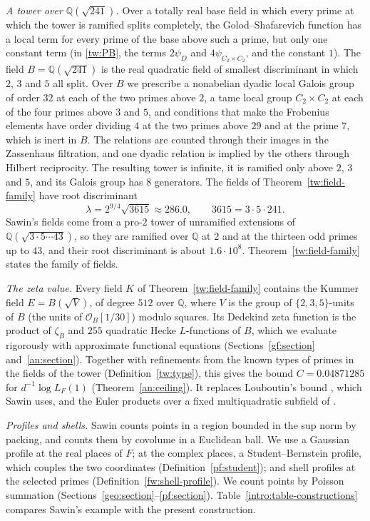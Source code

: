 \documentclass[11pt]{amsart}
\numberwithin{equation}{section}
\theoremstyle{definition}
\theoremstyle{remark}
\newcommand{\Q}{\mathbb Q}
\newcommand{\ceiling}{0.04871285}
\begin{document}
\emph{A tower over $\Q(\sqrt{241})$.} Over a totally real base field in
which every prime at which the tower is ramified splits completely, the
Golod--Shafarevich function has a local term for every prime of the
base above such a prime, but only one constant term (in
\eqref{tw:PB}, the terms $2\psi_D$ and $4\psi_{C_2\times C_2}$, and the
constant $1$). The field
$B=\Q(\sqrt{241})$ is the real quadratic field of smallest discriminant
in which $2$, $3$ and $5$ all split. Over $B$ we prescribe a nonabelian
dyadic local Galois group of order $32$ at each of the two primes above
$2$, a tame local group $C_2\times C_2$ at each of the four primes above
$3$ and $5$, and conditions that make the Frobenius elements have order
dividing $4$ at the two primes above $29$ and at the prime $7$, which is
inert in $B$. The relations are counted through their images in the
Zassenhaus filtration, and one dyadic relation is implied by the others
through Hilbert reciprocity. The resulting tower is infinite, it is
ramified only above $2$, $3$ and $5$, and its Galois group has $8$
generators. The fields of Theorem~\ref{tw:field-family} have root
discriminant
\[
 \lambda=2^{9/4}\sqrt{3615}\approx286.0,
 \qquad 3615=3\cdot5\cdot241.
\]
Sawin's fields come from a pro-$2$ tower of unramified extensions of
$\Q(\sqrt{3\cdot5\cdots43})$, so they are ramified over $\Q$ at $2$ and at
the thirteen odd primes up to $43$, and their root discriminant is about
$1.6\cdot10^8$. Theorem~\ref{tw:field-family}
states the family of fields.

\emph{The zeta value.} Every field $K$ of Theorem~\ref{tw:field-family}
contains the Kummer field $E=B(\sqrt V)$, of degree $512$ over $\Q$,
where $V$ is the group of $\{2,3,5\}$-units of $B$ (the units of
$\mathcal O_B[1/30]$) modulo squares. Its
Dedekind zeta function is the product of $\zeta_B$ and $255$ quadratic
Hecke $L$-functions of $B$, which we evaluate rigorously with approximate
functional equations (Sections~\ref{gf:section} and~\ref{an:section}).
Together with refinements from the known types of primes in the fields
of the tower (Definition~\ref{tw:type}), this gives the bound $C=\ceiling$ for $d^{-1}\log L_F(1)$
(Theorem~\ref{an:ceiling}). It replaces Louboutin's bound
\cite{Louboutin2000}, which Sawin uses, and the Euler products over a
fixed multiquadratic subfield of \cite{Naslund0358}.

\emph{Profiles and shells.} Sawin counts points in a region bounded in
the sup norm by packing, and \cite{Naslund0358} counts them by covolume
in a Euclidean ball. We use a Gaussian profile at the real places of
$F$; at the complex places, a Student--Bernstein profile, which couples
the two coordinates (Definition~\ref{pf:student}); and shell profiles at the selected primes
(Definition~\ref{fw:shell-profile}). We count points by Poisson
summation (Sections~\ref{geo:section}--\ref{pf:section}).
Table~\ref{intro:table-constructions} compares Sawin's example with the
present construction.
\end{document}
